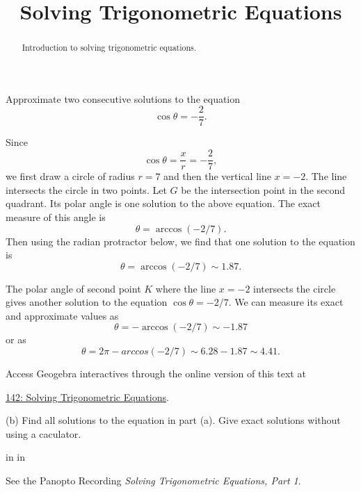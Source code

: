 \documentclass{ximera}
\title{Solving Trigonometric Equations}
\newcommand{\pskip}{\vskip 0.1 in}
\begin{document}
\begin{abstract}
Introduction to solving trigonometric equations.
\end{abstract}
\maketitle



\begin{example}  \label{Ex:43733g3e}
Approximate two consecutive solutions to the equation
\[
    \cos\theta =   -\frac{2}{7} .
\]

\begin{explanation}
 
Since
\[
   \cos \theta = \frac{x}{r} = -\frac{2}{7} ,
\]
we first draw a circle of radius $r=7$ and then the vertical line $x=-2$. The line intersects the circle in two points. Let $G$ be the intersection point in the second quadrant. Its polar angle is one solution to the above equation. The exact measure of this angle is 
\[
  \theta = \arccos(-2/7).
\]
Then using the radian protractor below, we find that one solution to the equation is 
\[
   \theta  = \arccos(-2/7) \sim 1.87 .
\]

The polar angle of second point $K$ where the line $x=-2$ intersects the circle gives another solution to the equation $\cos\theta = -2/7$. We can measure its exact and approximate values as
\[
   \theta = -\arccos(-2/7) \sim -1.87 
\]
or as
\[
       \theta = 2\pi - arccos(-2/7) \sim 6.28 - 1.87 \sim 4.41 .
\]


 
\begin{onlineOnly}
    \begin{center}
\end{center}
\end{onlineOnly}

Access Geogebra interactives through the online version of this text at
 
\href{https://www.geogebra.org/classic/qnhtd4h8}{142: Solving Trigonometric Equations}.


\end{explanation}

(b) Find all solutions to the equation in part (a). Give exact solutions without using a caculator.

\pskip \pskip

See the Panopto Recording \emph{Solving Trigonometric Equations, Part 1}.


\end{example}
\end{document}
